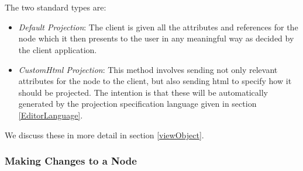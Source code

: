 \documentclass{article}
\begin{document}
\\
\\
The two standard types are:
\begin{itemize}
\item \emph{Default Projection}: The client is given all the attributes and references for the node which it then presents to the user in any meaningful way as decided by the client application.
\item \emph{CustomHtml Projection}: This method involves sending not only relevant attributes for the node to the client, but also sending html to specify how it should be projected. The intention is that these will be automatically generated by the projection specification language given in section \ref{EditorLanguage}.
\end{itemize}
We discuss these in more detail in section \ref{viewObject}.
\subsubsection{Making Changes to a Node}
\end{document}
